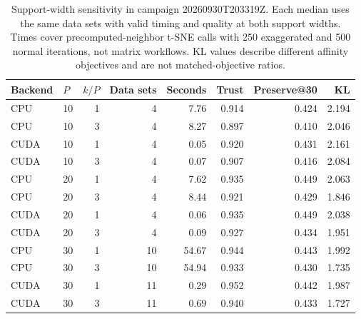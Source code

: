 \begin{table}[htbp]
\centering
\scriptsize
\caption{Support-width sensitivity in campaign 20260930T203319Z. Each median uses the same data sets with valid timing and quality at both support widths. Times cover precomputed-neighbor t-SNE calls with 250 exaggerated and 500 normal iterations, not matrix workflows. KL values describe different affinity objectives and are not matched-objective ratios.}
\label{tab:support-width}
\begin{tabular}{llrrrrrr}
\toprule
Backend & $P$ & $k/P$ & Data sets & Seconds & Trust & Preserve@30 & KL \\
\midrule
CPU & 10 & 1 & 4 & 7.76 & 0.914 & 0.424 & 2.194 \\
CPU & 10 & 3 & 4 & 8.27 & 0.897 & 0.410 & 2.046 \\
CUDA & 10 & 1 & 4 & 0.05 & 0.920 & 0.431 & 2.161 \\
CUDA & 10 & 3 & 4 & 0.07 & 0.907 & 0.416 & 2.084 \\
CPU & 20 & 1 & 4 & 7.62 & 0.935 & 0.449 & 2.063 \\
CPU & 20 & 3 & 4 & 8.44 & 0.921 & 0.429 & 1.846 \\
CUDA & 20 & 1 & 4 & 0.06 & 0.935 & 0.449 & 2.038 \\
CUDA & 20 & 3 & 4 & 0.09 & 0.927 & 0.434 & 1.951 \\
CPU & 30 & 1 & 10 & 54.67 & 0.944 & 0.443 & 1.992 \\
CPU & 30 & 3 & 10 & 54.94 & 0.933 & 0.430 & 1.735 \\
CUDA & 30 & 1 & 11 & 0.29 & 0.952 & 0.442 & 1.987 \\
CUDA & 30 & 3 & 11 & 0.69 & 0.940 & 0.433 & 1.727 \\
\bottomrule
\end{tabular}
\end{table}
